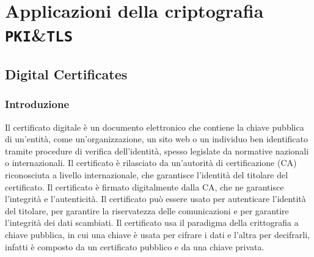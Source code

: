 \chapter{Applicazioni della criptografia \texttt{PKI}\&\texttt{TLS}}
\thispagestyle{chapterInit}
\section{Digital Certificates}
    \subsection{Introduzione}
        Il certificato digitale è un documento elettronico che contiene la chiave pubblica di un'entità, come un'organizzazione, un sito web o un individuo ben identificato tramite procedure di verifica dell'identità, spesso legislate da normative nazionali o internazionali. Il certificato è rilasciato da un'autorità di certificazione (CA) riconosciuta a livello internazionale, che garantisce l'identità del titolare del certificato. Il certificato è firmato digitalmente dalla CA, che ne garantisce l'integrità e l'autenticità. Il certificato può essere usato per autenticare l'identità del titolare, per garantire la riservatezza delle comunicazioni e per garantire l'integrità dei dati scambiati.
        Il certificato usa il paradigma della crittografia a chiave pubblica, in cui una chiave è usata per cifrare i dati e l'altra per decifrarli, infatti è composto da un certificato pubblico e da una chiave privata.
